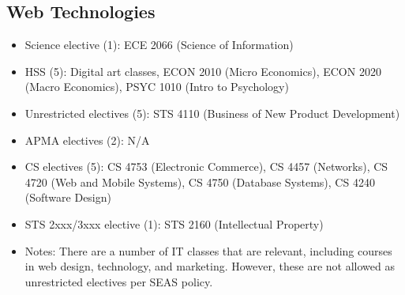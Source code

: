 \documentclass[10pt,letter,twocolumn]{book}
\newenvironment{itemlist}{
\begin{itemize}
\setlength{\itemsep}{0pt}
\setlength{\parskip}{0pt}}
{\end{itemize}}
\begin{document}
\subsection{Web Technologies}
\begin{itemlist}
\item Science elective (1): ECE 2066 (Science of Information)
\item HSS (5): Digital art classes, ECON 2010 (Micro Economics), ECON 2020 (Macro Economics), PSYC 1010 (Intro to Psychology)
\item Unrestricted electives (5): STS 4110 (Business of New Product Development)
\item APMA electives (2): N/A
\item CS electives (5): CS 4753 (Electronic Commerce), CS 4457 (Networks), CS 4720 (Web and Mobile Systems), CS 4750 (Database Systems), CS 4240 (Software Design)
\item STS 2xxx/3xxx elective (1): STS 2160 (Intellectual Property)
\item Notes: There are a number of IT classes that are relevant, including courses in web design, technology, and marketing.  However, these are not allowed as unrestricted electives per SEAS policy. 
\end{itemlist}
\end{document}
